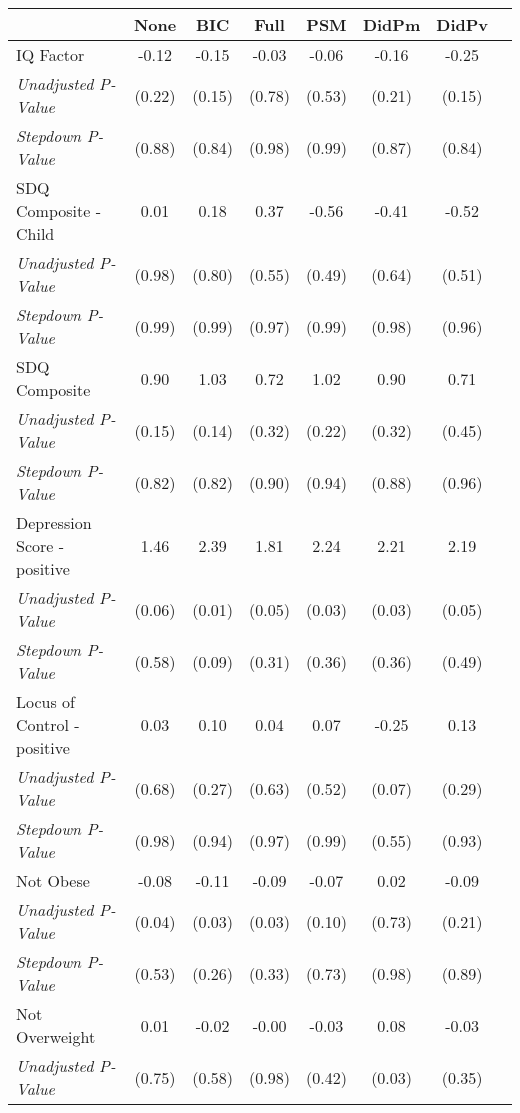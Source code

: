 \begin{tabular}{l c c c c c c c}
\toprule
 & None & BIC & Full & PSM & DidPm & DidPv \\
\midrule
IQ Factor & -0.12 & -0.15 & -0.03 & -0.06 & -0.16 & -0.25 \\
\quad \textit{Unadjusted P-Value} & (0.22) & (0.15) & (0.78) & (0.53) & (0.21) & (0.15) \\
\quad \textit{Stepdown P-Value} & (0.88) & (0.84) & (0.98) & (0.99) & (0.87) & (0.84) \\
SDQ Composite - Child & 0.01 & 0.18 & 0.37 & -0.56 & -0.41 & -0.52 \\
\quad \textit{Unadjusted P-Value} & (0.98) & (0.80) & (0.55) & (0.49) & (0.64) & (0.51) \\
\quad \textit{Stepdown P-Value} & (0.99) & (0.99) & (0.97) & (0.99) & (0.98) & (0.96) \\
SDQ Composite & 0.90 & 1.03 & 0.72 & 1.02 & 0.90 & 0.71 \\
\quad \textit{Unadjusted P-Value} & (0.15) & (0.14) & (0.32) & (0.22) & (0.32) & (0.45) \\
\quad \textit{Stepdown P-Value} & (0.82) & (0.82) & (0.90) & (0.94) & (0.88) & (0.96) \\
Depression Score - positive & 1.46 & 2.39 & 1.81 & 2.24 & 2.21 & 2.19 \\
\quad \textit{Unadjusted P-Value} & (0.06) & (0.01) & (0.05) & (0.03) & (0.03) & (0.05) \\
\quad \textit{Stepdown P-Value} & (0.58) & (0.09) & (0.31) & (0.36) & (0.36) & (0.49) \\
Locus of Control - positive & 0.03 & 0.10 & 0.04 & 0.07 & -0.25 & 0.13 \\
\quad \textit{Unadjusted P-Value} & (0.68) & (0.27) & (0.63) & (0.52) & (0.07) & (0.29) \\
\quad \textit{Stepdown P-Value} & (0.98) & (0.94) & (0.97) & (0.99) & (0.55) & (0.93) \\
Not Obese & -0.08 & -0.11 & -0.09 & -0.07 & 0.02 & -0.09 \\
\quad \textit{Unadjusted P-Value} & (0.04) & (0.03) & (0.03) & (0.10) & (0.73) & (0.21) \\
\quad \textit{Stepdown P-Value} & (0.53) & (0.26) & (0.33) & (0.73) & (0.98) & (0.89) \\
Not Overweight & 0.01 & -0.02 & -0.00 & -0.03 & 0.08 & -0.03 \\
\quad \textit{Unadjusted P-Value} & (0.75) & (0.58) & (0.98) & (0.42) & (0.03) & (0.35) \\

\end{tabular}
